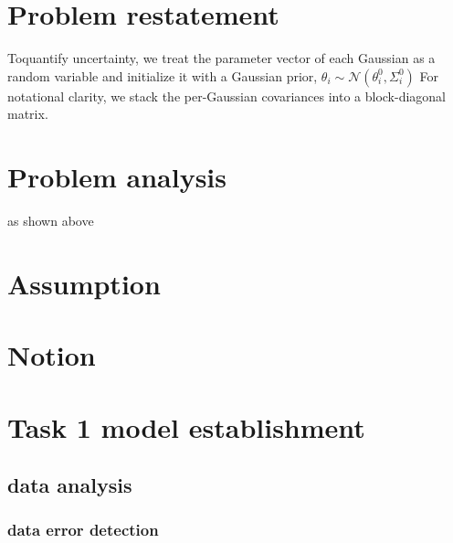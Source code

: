\documentclass[12pt]{article}
\begin{document}
\section{Problem restatement}
Toquantify uncertainty, we treat the parameter vector of each Gaussian as a random variable and initialize it with a Gaussian prior,
$\theta_i \sim \mathcal{N}(\theta_i^0,\Sigma_i^0)$ For notational clarity, we stack the per-Gaussian
covariances into a block-diagonal matrix.


\section{Problem analysis}
as shown above
\section{Assumption}

\section{Notion}

\section{Task 1 model establishment}
\subsection{data analysis}
\subsubsection{data error detection}

\end{document}
